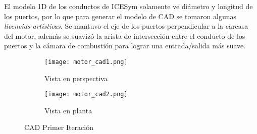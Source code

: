 El modelo 1D de los conductos de ICESym solamente ve diámetro y longitud  de los
puertos, por lo que para generar el modelo de CAD se tomaron algunas
\emph{licencias artísticas}.
%
Se mantuvo el eje de los puertos perpendicular a la carcasa del motor, además se
suavizó la arista de intersección entre el conducto de los puertos y la cámara
de combustión para lograr una entrada/salida más suave.

\begin{figure}
  \centering
    \begin{subfigure}{0.4\textwidth}
        \centering
        \texttt{[image: motor\_cad1.png]}
        \caption{Vista en perspectiva}
    \end{subfigure}
    \hfill
    \begin{subfigure}{0.4\textwidth}
        \centering
        \texttt{[image: motor\_cad2.png]}
        \caption{Vista en planta}
    \end{subfigure}
  \caption{CAD Primer Iteración}
  \label{fig:motor_cad}
\end{figure}

